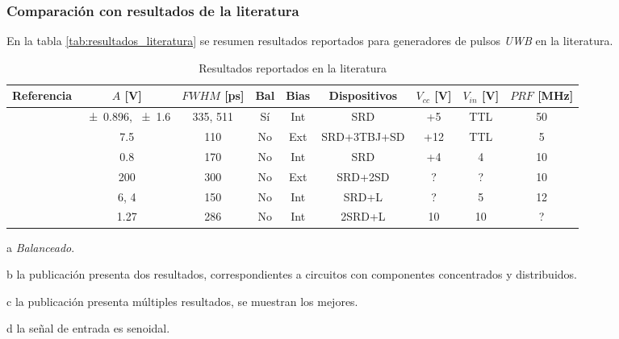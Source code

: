 \subsubsection{Comparación con resultados de la literatura}

En la tabla \ref{tab:resultados_literatura} se resumen resultados reportados
para generadores de pulsos \textit{UWB} en la literatura.

\begin{table}
  \begin{threeparttable}[b]
    \label{tab:mytable}
    \caption{Resultados reportados en la literatura}
    {\small
    \begin{tabular}{ccccccccc}
        \hline
        Referencia & $A$ [\unit{\volt}] & $FWHM$ [\unit{\pico\second}] &
        Bal \tnote{a} & Bias & Dispositivos & $V_{cc}$ [\unit{\volt}] & $V_{in}$ [\unit{\volt}] & $PRF$ [\unit{\mega\hertz}] \\
        \hline
        \cite{rulikowski2004} & \num{\pm 0.896}, \num{\pm 1.6} \tnote{b} & 335, 511 & Sí & Int & SRD & +5 & TTL & 50 \\
        \cite{protiva2009} & \num{7.5} & 110 & No & Ext & SRD+3TBJ+SD & +12 & TTL & 5 \\
        \cite{kamal2014} & \num{0.8} & 170 & No & Int & SRD & +4 & 4 & 10 \\
        \cite{han2002} & \num{200} & 300 & No & Ext & SRD+2SD & ? & ? & 10 \\
        \cite{han2005} & \num{+6}, \num{+4} & 150 & No & Int & SRD+L & ? & 5 & 12 \\
        \cite{oloumi2018} & \num{1.27} \tnote{c} & 286 & No & Int & 2SRD+L &
        10 & 10 \tnote{d} & ? \\
    \end{tabular}
}
   \begin{tablenotes}
     \item [a] \textit{Balanceado}.
     \item [b] la publicación presenta dos resultados, correspondientes a
       circuitos con componentes concentrados y distribuidos.
     \item [c] la publicación presenta múltiples resultados, se muestran
       los mejores.
     \item [d] la señal de entrada es senoidal.
   \end{tablenotes}
  \end{threeparttable}
\end{table}
